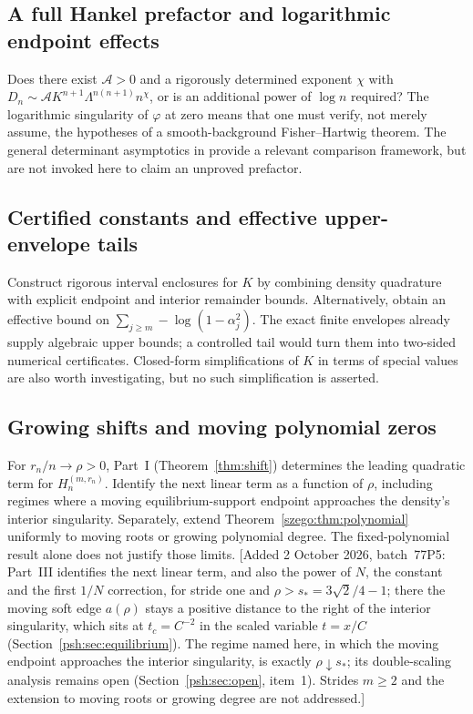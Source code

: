 \documentclass[11pt,a4paper]{article}
\numberwithin{equation}{section}
\theoremstyle{remark}\newtheorem{remark}[theorem]{Remark}
\newcommand{\Lam}{\Lambda}
\begin{document}
\subsection{A full Hankel prefactor and logarithmic endpoint effects}
Does there exist $\mathcal A>0$ and a rigorously determined exponent $\chi$
with
$D_n\sim\mathcal A K^{n+1}\Lam^{n(n+1)}n^\chi$,
or is an additional power of $\log n$ required?
The logarithmic singularity of $\varphi$ at zero means that one must verify,
not merely assume, the hypotheses of a smooth-background
Fisher--Hartwig theorem. The general determinant asymptotics in
\cite{dik} provide a relevant comparison framework, but are not invoked
here to claim an unproved prefactor.

\subsection{Certified constants and effective upper-envelope tails}
Construct rigorous interval enclosures for $K$ by combining density
quadrature with explicit endpoint and interior remainder bounds.
Alternatively, obtain an effective bound on
$\sum_{j\geq m}-\log(1-\alpha_j^2)$.
The exact finite envelopes already supply algebraic upper bounds; a controlled
tail would turn them into two-sided numerical certificates.
Closed-form simplifications of $K$ in terms of special values are also worth
investigating, but no such simplification is asserted.

\subsection{Growing shifts and moving polynomial zeros}
For $r_n/n\to\rho>0$, Part~I (Theorem~\ref{thm:shift}) determines the leading quadratic
term for $H_n^{(m,r_n)}$. Identify the next linear term as a function of
$\rho$, including regimes where a moving equilibrium-support endpoint
approaches the density's interior singularity.
Separately, extend Theorem~\ref{szego:thm:polynomial} uniformly to moving roots
or growing polynomial degree. The fixed-polynomial result alone does not
justify those limits.
[Added 2 October 2026, batch~77P5: Part~III identifies the next linear term,
and also the power of $N$, the constant and the first $1/N$ correction, for
stride one and $\rho>s_*=3\sqrt2/4-1$; there the moving soft edge $a(\rho)$
stays a positive distance to the right of the interior singularity, which
sits at $t_c=C^{-2}$ in the scaled variable $t=x/C$
(Section~\ref{psh:sec:equilibrium}). The regime named here, in which the
moving endpoint approaches the interior singularity, is exactly
$\rho\downarrow s_*$; its double-scaling analysis remains open
(Section~\ref{psh:sec:open}, item~1). Strides $m\geq2$ and the extension to
moving roots or growing degree are not addressed.]
\end{document}
